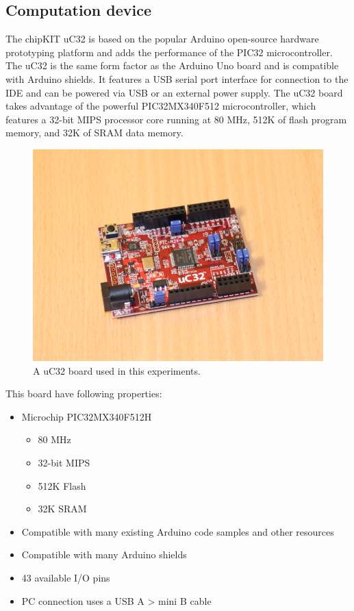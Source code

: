 \FloatBarrier
\subsection{Computation device}
The chipKIT uC32 is based on the popular Arduino open-source hardware prototyping platform and
adds the performance of the  PIC32 microcontroller. 
The uC32 is the same form factor as the Arduino Uno board and is compatible with Arduino shields.
It features a USB serial port interface for connection to the IDE and can be powered via USB or an 
external power supply. 
The uC32 board takes advantage of the powerful PIC32MX340F512 microcontroller, which features a 
32-bit MIPS processor core running at 80 MHz, 512K of flash program memory, and 32K of
SRAM data memory.
\begin{figure}[htb] 
	\centering
	\includegraphics[width=\textwidth]{figures/pic_board}
	\caption{A uC32 board used in this experiments.}
	\label{fig:pic-board}
\end{figure}
This board have following properties:
\begin{itemize}
	\item Microchip PIC32MX340F512H
		\begin{itemize}
			\item 80 MHz
			\item 32-bit MIPS
			\item 512K Flash
			\item 32K SRAM
		\end{itemize}
	\item Compatible with many existing Arduino code samples and other resources
	\item Compatible with many Arduino shields
	\item 43 available I/O pins
	\item PC connection uses a USB A > mini B cable
\end{itemize}

